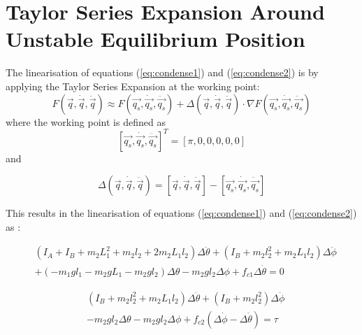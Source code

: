 \section{Taylor Series Expansion Around Unstable Equilibrium Position}
\label{sec:linerisation}
The linearisation of equations (\ref{eq:condense1}) and (\ref{eq:condense2}) is by applying the Taylor Series Expansion at the working point:
\begin{equation}
	F(  \vec{q}, \dot{ \vec{q} }, \ddot{ \vec{q} } )  \approx  F(\vec{q_{s}},\dot{\vec{q_{s}}},\ddot{\vec{q_{s}}}) + \Delta( \vec{q}, \dot{ \vec{q} }, \ddot{ \vec{q} })\cdot \nabla F(\vec{q_{s}},\dot{\vec{q_{s}}},\ddot{\vec{q_{s}}})
\end{equation}
where the working point is defined as 
\begin{equation}
\label{eq:workingpoint}
[\vec{q_{s}},\dot{\vec{q_{s}}},\ddot{\vec{q_{s}}}]^{T}=[\pi,0,0,0,0,0]
\end{equation}
and 

\begin{equation}
\label{eq:workingpoint}
\Delta( \vec{q}, \dot{ \vec{q} }, \ddot{ \vec{q} }) =  [\vec{q}, \dot{ \vec{q} }, \ddot{ \vec{q} }] - [\vec{q_{s}},\dot{\vec{q_{s}}},\ddot{\vec{q_{s}}}]
\end{equation}

This results in the linearisation of equations (\ref{eq:condense1}) and (\ref{eq:condense2}) as :

\begin{equation}
\begin{split}
&(I_{A} + I_{B} + m_{2}L_{1}^2+m_{2}l_{2}+2m_{2}L_{1}l_{2})\Delta\ddot{\theta} + (I_{B}+m_{2}l_{2}^2+m_{2}L_{1}l_{2})\Delta\ddot{\phi}\\
&+(-m_{1}gl_{1}-m_{2}gL_{1}-m_{2}gl_{2})\Delta\theta -m_{2}gl_{2}\Delta\phi + f_{c1}\Delta\dot{\theta} = 0
\end{split}
\end{equation}

\begin{equation}
\begin{split}
&(I_{B}+m_{2}l_{2}^2+m_{2}L_{1}l_{2})\Delta\ddot{\theta} + (I_{B}+m_{2}l_{2}^2)\Delta\ddot{\phi}\\
& -m_{2}gl_{2}\Delta\theta -m_{2}gl_{2}\Delta\phi +f_{c2}(\Delta\dot{\phi}-\Delta\dot{\theta}) = \tau
\end{split}
\end{equation}












